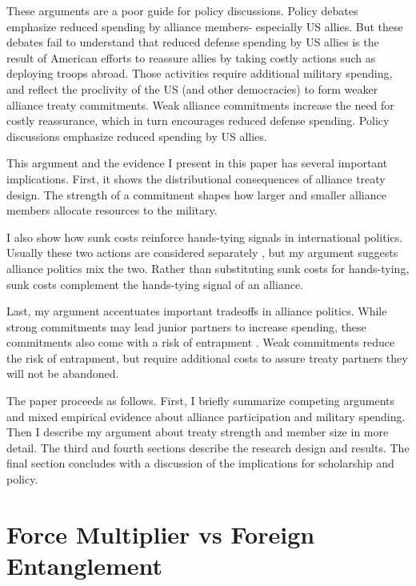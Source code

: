 \documentclass[12pt]{article}
\begin{document}
These arguments are a poor guide for policy discussions. 
Policy debates emphasize reduced spending by alliance members- especially US allies. 
But these debates fail to understand that reduced defense spending by US allies is the result of American efforts to reassure allies by taking costly actions such as deploying troops abroad. 
Those activities require additional military spending, and reflect the proclivity of the US (and other democracies) to form weaker alliance treaty commitments. 
Weak alliance commitments increase the need for costly reassurance, which in turn encourages reduced defense spending. 
Policy discussions emphasize reduced spending by US allies.  


This argument and the evidence I present in this paper has several important implications. 
First, it shows the distributional consequences of alliance treaty design. 
The strength of a commitment shapes how larger and smaller alliance members allocate resources to the military. 


I also show how sunk costs reinforce hands-tying signals in international politics. 
Usually these two actions are considered separately \citep{Fearon1997, FuhrmannSechser2014}, but my argument suggests alliance politics mix the two. 
Rather than substituting sunk costs for hands-tying, sunk costs complement the hands-tying signal of an alliance. 


Last, my argument accentuates important tradeoffs in alliance politics.
While strong commitments may lead junior partners to increase spending, these commitments also come with a risk of entrapment \citep{Benson2012}.
Weak commitments reduce the risk of entrapment, but require additional costs to assure treaty partners they will not be abandoned.


The paper proceeds as follows. 
First, I briefly summarize competing arguments and mixed empirical evidence about alliance participation and military spending. 
Then I describe my argument about treaty strength and member size in more detail. 
The third and fourth sections describe the research design and results. 
The final section concludes with a discussion of the implications for scholarship and policy.  


\section{Force Multiplier vs Foreign Entanglement}

\end{document}
